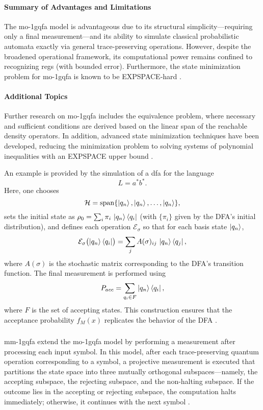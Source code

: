 \paragraph{Summary of Advantages and Limitations}  
The \gls{mo-1gqfa} model is advantageous due to its structural simplicity—requiring only a final measurement—and its ability to simulate classical probabilistic automata exactly via general trace-preserving operations. However, despite the broadened operational framework, its computational power remains confined to recognizing \glspl{reg} (with bounded error). Furthermore, the state minimization problem for \gls{mo-1gqfa} is known to be EXPSPACE-hard \cite{mateus2012complexity}.

\paragraph{Additional Topics}  
Further research on \gls{mo-1gqfa} includes the equivalence problem, where necessary and sufficient conditions are derived based on the linear span of the reachable density operators. In addition, advanced state minimization techniques have been developed, reducing the minimization problem to solving systems of polynomial inequalities with an EXPSPACE upper bound \cite{mercer2008lower}.

\begin{example}  
An example is provided by the simulation of a \gls{dfa} for the language
\[
L=a^*b^*.
\]
Here, one chooses 
\[
\mathcal{H}=\mathrm{span}\{\ket{q_n},\ket{q_n},\dots,\ket{q_n}\},
\]
sets the initial state as $\rho_0=\sum_{i}\pi_i\,\ket{q_n}\bra{q_i}$ (with $\{\pi_i\}$ given by the DFA's initial distribution), and defines each operation $\mathcal{E}_\sigma$ so that for each basis state $\ket{q_n}$,
\[
\mathcal{E}_\sigma\bigl(\ket{q_n}\bra{q_i}\bigr)=\sum_{j}A(\sigma)_{ij}\,\ket{q_n}\bra{q_j},
\]
where $A(\sigma)$ is the stochastic matrix corresponding to the DFA's transition function. The final measurement is performed using 
\[
P_{acc}=\sum_{q_i\in F}\ket{q_n}\bra{q_i},
\]
where $F$ is the set of accepting states. This construction ensures that the acceptance probability $f_M(x)$ replicates the behavior of the DFA \cite{li2012characterizations}.
\end{example}

\subsubsection{}
\gls{mm-1gqfa} extend the \gls{mo-1gqfa} model by performing a measurement after processing each input symbol. In this model, after each trace-preserving quantum operation corresponding to a symbol, a projective measurement is executed that partitions the state space into three mutually orthogonal subspaces—namely, the accepting subspace, the rejecting subspace, and the non-halting subspace. If the outcome lies in the accepting or rejecting subspace, the computation halts immediately; otherwise, it continues with the next symbol \cite{li2012characterizations}.

